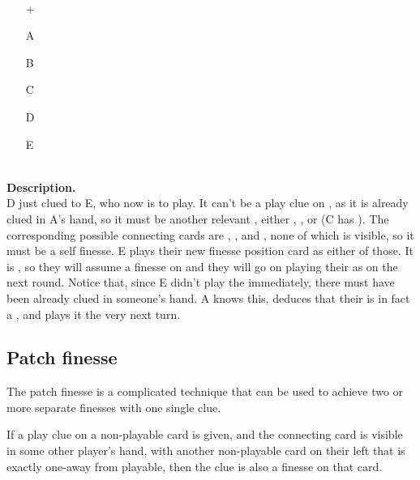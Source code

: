 \begin{example}	\hfill \\
	\begin{minipage}{0.45\textwidth}
		\begin{itemize}
			\item[\Large +]      
			\item[\Large A]    
			\item[\Large B]    
			\item[\Large C]    
			\item[\Large D]    
			\item[\Large E]    
		\end{itemize}
	\end{minipage}%
	\begin{minipage}{0.55\textwidth}
		\hfill \\
		
		\textbf{Description.} \\
		
		D just clued  to E, who now is to play. It can't be a play clue on , as it is already clued in A's hand, so it must be another relevant , either , , or  (C has ). The corresponding possible connecting cards are , , and , none of which is visible, so it must be a self finesse. E plays their new finesse position card as either of those. It is , so they will assume a finesse on  and they will go on playing their  as  on the next round. Notice that, since E didn't play the  immediately, there must have been  already clued in someone's hand. A knows this, deduces that their  is in fact a , and plays it the very next turn.
	\end{minipage}
\end{example} \vspace{0.15 cm}

\subsection{Patch finesse}

The patch finesse is a complicated technique that can be used to achieve two or more separate finesses with one single clue.

\begin{convention}
	\label{patch-finesse}
	If a play clue on a non-playable card is given, and the connecting card is visible in some other player's hand, with another non-playable card on their left that is exactly one-away from playable, then the clue is also a finesse on that card.
\end{convention}

